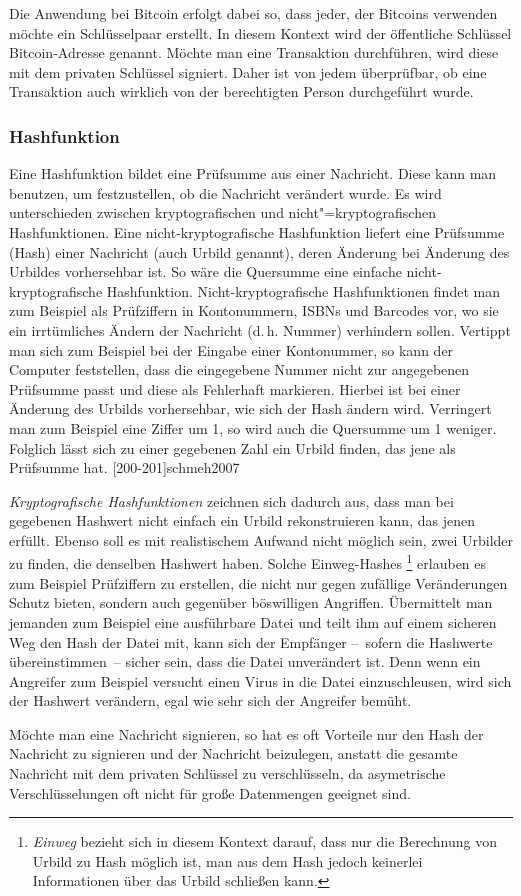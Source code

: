 Die Anwendung bei Bitcoin erfolgt dabei so, dass jeder, der Bitcoins verwenden möchte ein Schlüsselpaar erstellt.
In diesem Kontext wird der öffentliche Schlüssel Bitcoin-Adresse genannt.
Möchte man eine Transaktion durchführen, wird diese mit dem privaten Schlüssel signiert.
Daher ist von jedem überprüfbar, ob eine Transaktion auch wirklich von der berechtigten Person durchgeführt wurde.

\subsubsection{Hashfunktion}

Eine Hashfunktion bildet eine Prüfsumme aus einer Nachricht.
Diese kann man benutzen, um festzustellen, ob die Nachricht verändert wurde.
Es wird unterschieden zwischen kryptografischen und nicht"=kryptografischen Hashfunktionen.
Eine nicht-kryptografische Hashfunktion liefert eine Prüfsumme (Hash) einer Nachricht (auch Urbild genannt), deren Änderung bei Änderung des Urbildes vorhersehbar ist.
So wäre die Quersumme eine einfache nicht-kryptografische Hashfunktion.
Nicht-kryptografische Hashfunktionen findet man zum Beispiel als Prüfziffern in Kontonummern, ISBNs und Barcodes vor, wo sie ein irrtümliches Ändern der Nachricht (d.\,h. Nummer) verhindern sollen.
Vertippt man sich zum Beispiel bei der Eingabe einer Kontonummer, so kann der Computer feststellen, dass die eingegebene Nummer nicht zur angegebenen Prüfsumme passt und diese als Fehlerhaft markieren.
Hierbei ist bei einer Änderung des Urbilds vorhersehbar, wie sich der Hash ändern wird.
Verringert man zum Beispiel eine Ziffer um 1, so wird auch die Quersumme um 1 weniger.
Folglich lässt sich zu einer gegebenen Zahl ein Urbild finden, das jene als Prüfsumme hat.
[200-201]{schmeh2007}

\emph{Kryptografische Hashfunktionen} zeichnen sich dadurch aus, dass man bei gegebenen Hashwert nicht einfach ein Urbild rekonstruieren kann, das jenen erfüllt.
Ebenso soll es mit realistischem Aufwand nicht möglich sein, zwei Urbilder zu finden, die denselben Hashwert haben.
Solche Einweg-Hashes%
\footnote{\emph{Einweg} bezieht sich in diesem Kontext darauf, dass nur die Berechnung von Urbild zu Hash möglich ist, man aus dem Hash jedoch keinerlei Informationen über das Urbild schließen kann.}
erlauben es zum Beispiel Prüfziffern zu erstellen, die nicht nur gegen zufällige Veränderungen Schutz bieten, sondern auch gegenüber böswilligen Angriffen.
Übermittelt man jemanden zum Beispiel eine ausführbare Datei und teilt ihm auf einem sicheren Weg den Hash der Datei mit, kann sich der Empfänger --~sofern die Hashwerte übereinstimmen~-- sicher sein, dass die Datei unverändert ist.
Denn wenn ein Angreifer zum Beispiel versucht einen Virus in die Datei einzuschleusen, wird sich der Hashwert verändern, egal wie sehr sich der Angreifer bemüht.

Möchte man eine Nachricht signieren, so hat es oft Vorteile nur den Hash der Nachricht zu signieren und der Nachricht beizulegen, anstatt die gesamte Nachricht mit dem privaten Schlüssel zu verschlüsseln, da asymetrische Verschlüsselungen oft nicht für große Datenmengen geeignet sind.
